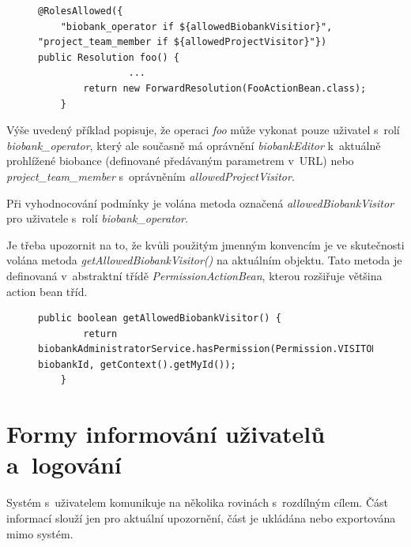 \documentclass[11pt, draft, oneside]{fithesis2}
\begin{document}
\begin{figure}[h!]
\begin{center}
\begin{lstlisting}[mathescape=false]
@RolesAllowed({
	"biobank_operator if ${allowedBiobankVisitior}", "project_team_member if ${allowedProjectVisitor}"})
public Resolution foo() { 
				...
        return new ForwardResolution(FooActionBean.class);
    }
\end{lstlisting}
\end{center}
\end{figure}

Výše uvedený příklad popisuje, že operaci \textit{foo} může vykonat pouze uživatel s~rolí \textit{biobank\_operator}, který ale současně má oprávnění \textit{biobankEditor} k~aktuálně prohlížené biobance (definované předávaným parametrem v~URL) nebo \textit{project\_team\_member} s~oprávněním \textit{allowedProjectVisitor}.

Při vyhodnocování podmínky je volána metoda označená \textit{allowedBiobankVisitor} pro uživatele s~rolí \textit{biobank\_operator}. 

Je třeba upozornit na to, že kvůli použitým jmenným konvencím je ve skutečnosti volána metoda \textit{getAllowedBiobankVisitor()} na aktuálním objektu. Tato metoda je definovaná v~abstraktní třídě \textit{PermissionActionBean}, kterou rozšiřuje většina action bean tříd.

\begin{figure}[h!]
\begin{center}
\begin{lstlisting}
public boolean getAllowedBiobankVisitor() {
        return biobankAdministratorService.hasPermission(Permission.VISITOR, biobankId, getContext().getMyId());
    }
\end{lstlisting}
\end{center}
\end{figure}

\section{Formy informování uživatelů a~logování}
Systém s~uživatelem komunikuje na několika rovinách s~rozdílným cílem. Část informací slouží jen pro aktuální upozornění, část je ukládána nebo exportována mimo systém.
\end{document}
